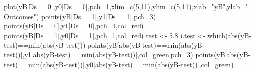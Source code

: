 \documentclass[
]{book}
\newenvironment{Shaded}{\begin{snugshade}}{\end{snugshade}}
\newcommand{\AttributeTok}[1]{\textcolor[rgb]{0.77,0.63,0.00}{#1}}
\newcommand{\DecValTok}[1]{\textcolor[rgb]{0.00,0.00,0.81}{#1}}
\newcommand{\FloatTok}[1]{\textcolor[rgb]{0.00,0.00,0.81}{#1}}
\newcommand{\FunctionTok}[1]{\textcolor[rgb]{0.00,0.00,0.00}{#1}}
\newcommand{\NormalTok}[1]{#1}
\newcommand{\OtherTok}[1]{\textcolor[rgb]{0.56,0.35,0.01}{#1}}
\newcommand{\SpecialCharTok}[1]{\textcolor[rgb]{0.00,0.00,0.00}{#1}}
\newcommand{\StringTok}[1]{\textcolor[rgb]{0.31,0.60,0.02}{#1}}
\theoremstyle{definition}
\theoremstyle{definition}
\theoremstyle{definition}
\theoremstyle{definition}
\theoremstyle{remark}
\begin{document}
\begin{Shaded}
\begin{Highlighting}[]
\FunctionTok{plot}\NormalTok{(yB[Ds}\SpecialCharTok{==}\DecValTok{0}\NormalTok{],y0[Ds}\SpecialCharTok{==}\DecValTok{0}\NormalTok{],}\AttributeTok{pch=}\DecValTok{1}\NormalTok{,}\AttributeTok{xlim=}\FunctionTok{c}\NormalTok{(}\DecValTok{5}\NormalTok{,}\DecValTok{11}\NormalTok{),}\AttributeTok{ylim=}\FunctionTok{c}\NormalTok{(}\DecValTok{5}\NormalTok{,}\DecValTok{11}\NormalTok{),}\AttributeTok{xlab=}\StringTok{"yB"}\NormalTok{,}\AttributeTok{ylab=}\StringTok{"Outcomes"}\NormalTok{)}
\FunctionTok{points}\NormalTok{(yB[Ds}\SpecialCharTok{==}\DecValTok{1}\NormalTok{],y1[Ds}\SpecialCharTok{==}\DecValTok{1}\NormalTok{],}\AttributeTok{pch=}\DecValTok{3}\NormalTok{)}
\FunctionTok{points}\NormalTok{(yB[Ds}\SpecialCharTok{==}\DecValTok{0}\NormalTok{],y1[Ds}\SpecialCharTok{==}\DecValTok{0}\NormalTok{],}\AttributeTok{pch=}\DecValTok{3}\NormalTok{,}\AttributeTok{col=}\StringTok{\textquotesingle{}red\textquotesingle{}}\NormalTok{)}
\FunctionTok{points}\NormalTok{(yB[Ds}\SpecialCharTok{==}\DecValTok{1}\NormalTok{],y0[Ds}\SpecialCharTok{==}\DecValTok{1}\NormalTok{],}\AttributeTok{pch=}\DecValTok{1}\NormalTok{,}\AttributeTok{col=}\StringTok{\textquotesingle{}red\textquotesingle{}}\NormalTok{)}
\NormalTok{test }\OtherTok{\textless{}{-}} \FloatTok{5.8}
\NormalTok{i.test }\OtherTok{\textless{}{-}} \FunctionTok{which}\NormalTok{(}\FunctionTok{abs}\NormalTok{(yB}\SpecialCharTok{{-}}\NormalTok{test)}\SpecialCharTok{==}\FunctionTok{min}\NormalTok{(}\FunctionTok{abs}\NormalTok{(yB}\SpecialCharTok{{-}}\NormalTok{test)))}
\FunctionTok{points}\NormalTok{(yB[}\FunctionTok{abs}\NormalTok{(yB}\SpecialCharTok{{-}}\NormalTok{test)}\SpecialCharTok{==}\FunctionTok{min}\NormalTok{(}\FunctionTok{abs}\NormalTok{(yB}\SpecialCharTok{{-}}\NormalTok{test))],y1[}\FunctionTok{abs}\NormalTok{(yB}\SpecialCharTok{{-}}\NormalTok{test)}\SpecialCharTok{==}\FunctionTok{min}\NormalTok{(}\FunctionTok{abs}\NormalTok{(yB}\SpecialCharTok{{-}}\NormalTok{test))],}\AttributeTok{col=}\StringTok{\textquotesingle{}green\textquotesingle{}}\NormalTok{,}\AttributeTok{pch=}\DecValTok{3}\NormalTok{)}
\FunctionTok{points}\NormalTok{(yB[}\FunctionTok{abs}\NormalTok{(yB}\SpecialCharTok{{-}}\NormalTok{test)}\SpecialCharTok{==}\FunctionTok{min}\NormalTok{(}\FunctionTok{abs}\NormalTok{(yB}\SpecialCharTok{{-}}\NormalTok{test))],y0[}\FunctionTok{abs}\NormalTok{(yB}\SpecialCharTok{{-}}\NormalTok{test)}\SpecialCharTok{==}\FunctionTok{min}\NormalTok{(}\FunctionTok{abs}\NormalTok{(yB}\SpecialCharTok{{-}}\NormalTok{test))],}\AttributeTok{col=}\StringTok{\textquotesingle{}green\textquotesingle{}}\NormalTok{)}

\end{Highlighting}
\end{Shaded}
\end{document}

